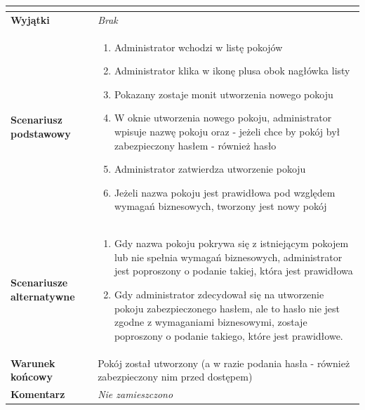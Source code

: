 \documentclass[11pt,oneside,a4paper,titlepage,onecolumn]{article}
\newenvironment{enumreq}
{ \begin{enumerate}[topsep=0pt,itemsep=-1ex,partopsep=1ex,parsep=1ex] }
{ \end{enumerate}                  }
\begin{document}
{\begin{tabular}{ | l | l | }
{		}
		\\
		
	\hline
		\parbox[t]{4cm}{\textbf{Wyjątki}} & \parbox[t]{11cm}{
			\textit{Brak}
			
		}
		\\

	\hline
		\parbox[t]{4cm}{\textbf{Scenariusz podstawowy}} & \parbox[t]{11cm}{
			\begin{enumreq}
				\item Administrator wchodzi w listę pokojów
				\item Administrator klika w ikonę plusa obok nagłówka listy
				\item Pokazany zostaje monit utworzenia nowego pokoju
				\item W oknie utworzenia nowego pokoju, administrator
				wpisuje nazwę pokoju oraz - jeżeli chce by pokój był 
				zabezpieczony hasłem - również hasło
				\item Administrator zatwierdza utworzenie pokoju
				\item Jeżeli nazwa pokoju jest prawidłowa pod względem 
				wymagań biznesowych, tworzony jest nowy pokój
			\end{enumreq}
		}
		\\
		
	\hline
		\parbox[t]{4cm}{\textbf{Scenariusze alternatywne}} & \parbox[t]
		{11cm}{
			\begin{enumreq}
				\item Gdy nazwa pokoju pokrywa się z istniejącym
				pokojem lub nie spełnia wymagań biznesowych, 
				administrator jest poproszony o podanie takiej, która
				jest prawidłowa
				\item Gdy administrator zdecydował się na utworzenie
				pokoju zabezpieczonego hasłem, ale to hasło nie jest
				zgodne z wymaganiami biznesowymi, zostaje poproszony 
				o podanie takiego, które jest prawidłowe.
			\end{enumreq}
		}
		\\
		
	\hline
		\parbox[t]{4cm}{\textbf{Warunek końcowy}} & \parbox[t]{11cm}{
			Pokój został utworzony (a w razie podania hasła - również
			zabezpieczony nim przed dostępem)
		}
		\\
		
	\hline
		\parbox[t]{4cm}{\textbf{Komentarz}} & \parbox[t]{11cm}{
			\textit{Nie zamieszczono}
		}
		\\

	\hline
\end{tabular}

}
\end{document}
